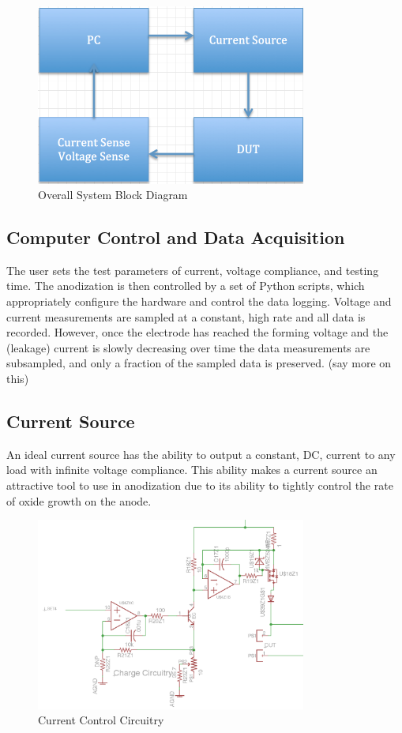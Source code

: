 \documentclass[journal]{IEEEtran}
\begin{document}
\begin{figure}[here]
\centering
\includegraphics[width=3.5in]{blockDiagram}
\caption{Overall System Block Diagram}
\label{fig:blockDiagram}
\end{figure}

\subsection{Computer Control and Data Acquisition}

The user sets the test parameters of current, voltage compliance, and testing time. The anodization is then controlled by a set of Python scripts, which appropriately configure the hardware and control the data logging. Voltage and current measurements are sampled at a constant, high rate and all data is recorded. However, once the electrode has reached the forming voltage and the (leakage) current is slowly decreasing over time the data measurements are subsampled, and only a fraction of the sampled data is preserved.  (say more on this)

\subsection{Current Source}

An ideal current source has the ability to output a constant, DC, current to any load with infinite voltage compliance. This ability makes a current source an attractive tool to use in anodization due to its ability to tightly control the rate of oxide growth on the anode.

\begin{figure}[here]
\centering
\includegraphics[width=3.5in]{currentMirror}
\caption{Current Control Circuitry}
\label{fig:currentMirror}
\end{figure}
\end{document}
